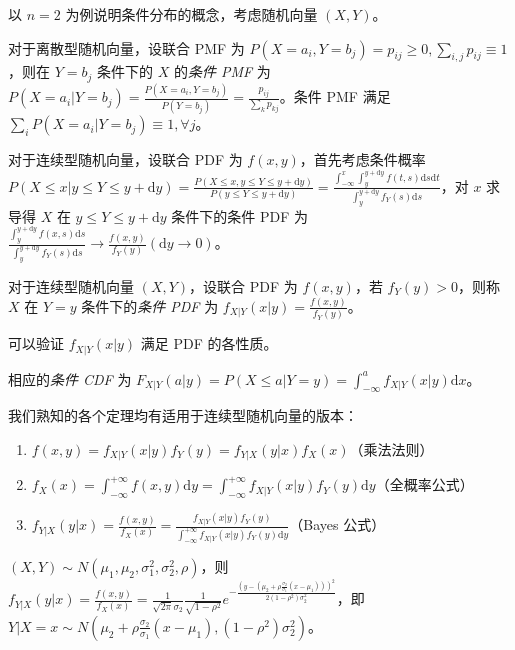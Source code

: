 \documentclass[../main.tex]{subfiles}
\begin{document}
以 $n=2$ 为例说明条件分布的概念，考虑随机向量 $(X,Y)$。

对于离散型随机向量，设联合 PMF 为 $P(X=a_i,Y=b_j)=p_{ij}\geq0,\sum_{i,j}p_{ij}\equiv1$，则在 $Y=b_j$ 条件下的 $X$ 的\emph{条件 PMF} 为 $P(X=a_i|Y=b_j)=\frac{P(X=a_i,Y=b_j)}{P(Y=b_j)}=\frac{p_{ij}}{\sum_kp_{kj}}$。条件 PMF 满足 $\sum_iP(X=a_i|Y=b_j)\equiv1,\forall j$。

对于连续型随机向量，设联合 PDF 为 $f(x,y)$，首先考虑条件概率 $P(X\leq x|y\leq Y\leq y+\mathrm dy)=\frac{P(X\leq x,y\leq Y\leq y+\mathrm dy)}{P(y\leq Y\leq y+\mathrm dy)}=\frac{\int_{-\infty}^x\int_y^{y+\mathrm dy}f(t,s)\mathrm ds\mathrm dt}{\int_y^{y+\mathrm dy}f_Y(s)\mathrm ds}$，对 $x$ 求导得 $X$ 在 $y\leq Y\leq y+\mathrm dy$ 条件下的条件 PDF 为 $\frac{\int_y^{y+\mathrm dy}f(x,s)\mathrm ds}{\int_y^{y+\mathrm dy}f_Y(s)\mathrm ds}\rightarrow\frac{f(x,y)}{f_Y(y)}(\mathrm dy\rightarrow 0)$。

\begin{definition}\label{def:3.5.1}
    对于连续型随机向量 $(X,Y)$，设联合 PDF 为 $f(x,y)$，若 $f_Y(y)>0$，则称 $X$ 在 $Y=y$ 条件下的\emph{条件 PDF} 为 $f_{X|Y}(x|y)=\frac{f(x,y)}{f_Y(y)}$。
\end{definition}

可以验证 $f_{X|Y}(x|y)$ 满足 PDF 的各性质。

相应的\emph{条件 CDF} 为 $F_{X|Y}(a|y)=P(X\leq a|Y=y)=\int_{-\infty}^af_{X|Y}(x|y)\mathrm dx$。

我们熟知的各个定理均有适用于连续型随机向量的版本：
\begin{enumerate}
    \item $f(x,y)=f_{X|Y}(x|y)f_Y(y)=f_{Y|X}(y|x)f_X(x)$（乘法法则）
    \item $f_X(x)=\int_{-\infty}^{+\infty}f(x,y)\mathrm dy=\int_{-\infty}^{+\infty}f_{X|Y}(x|y)f_Y(y)\mathrm dy$（全概率公式）
    \item $f_{Y|X}(y|x)=\frac{f(x,y)}{f_X(x)}=\frac{f_{X|Y}(x|y)f_Y(y)}{\int_{-\infty}^{+\infty}f_{X|Y}(x|y)f_Y(y)\mathrm dy}$（Bayes 公式）
\end{enumerate}

\begin{example}
    $(X,Y)\sim N(\mu_1,\mu_2,\sigma_1^2,\sigma_2^2,\rho)$，则 $f_{Y|X}(y|x)=\frac{f(x,y)}{f_X(x)}=\frac{1}{\sqrt{2\pi}\sigma_2}\frac{1}{\sqrt{1-\rho^2}}e^{-\frac{(y-(\mu_2+\rho\frac{\sigma_2}{\sigma_1}(x-\mu_1)))^2}{2(1-\rho^2)\sigma_2^2}}$，即 $Y|X=x\sim N(\mu_2+\rho\frac{\sigma_2}{\sigma_1}(x-\mu_1),(1-\rho^2)\sigma_2^2)$。
\end{example}
\end{document}
